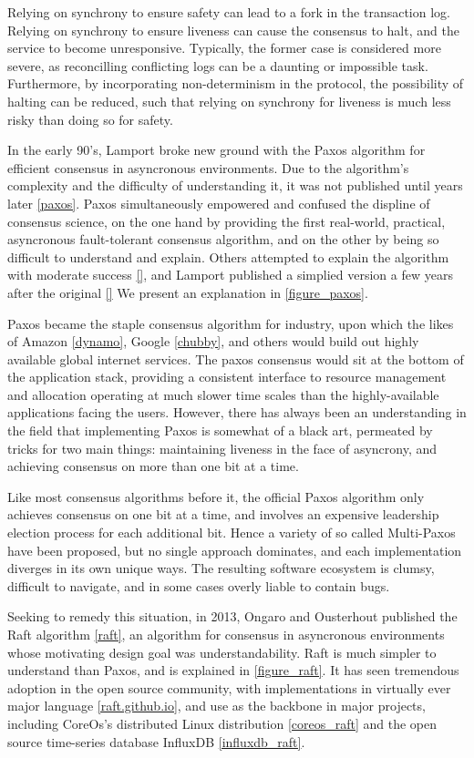 Relying on synchrony to ensure safety can lead to a fork in the transaction log.
Relying on synchrony to ensure liveness can cause the consensus to halt, and the service to become unresponsive.
Typically, the former case is considered more severe, as reconcilling conflicting logs can be a daunting or impossible task. 
Furthermore, by incorporating non-determinism in the protocol, the possibility of halting can be reduced,
such that relying on synchrony for liveness is much less risky than doing so for safety. 

In the early 90's, Lamport broke new ground with the Paxos algorithm for efficient consensus in asyncronous environments.
Due to the algorithm's complexity and the difficulty of understanding it, it was not published until years later \ref{paxos}.
Paxos simultaneously empowered and confused the displine of consensus science,
on the one hand by providing the first real-world, practical, asyncronous fault-tolerant consensus algorithm,
and on the other by being so difficult to understand and explain.
Others attempted to explain the algorithm with moderate success \ref{}, and Lamport published a simplied version 
a few years after the original \ref{}
We present an explanation in \ref{figure_paxos}.

Paxos became the staple consensus algorithm for industry, upon which the likes of Amazon \ref{dynamo}, Google \ref{chubby}, and others would build out highly available global internet services.
The paxos consensus would sit at the bottom of the application stack, providing a consistent interface to resource management and allocation operating at much slower time scales than the highly-available applications facing the users.
However, there has always been an understanding in the field that implementing Paxos is somewhat of a black art,
permeated by tricks for two main things: maintaining liveness in the face of asyncrony, and achieving consensus on more than one bit at a time.

Like most consensus algorithms before it, the official Paxos algorithm only achieves consensus on one bit at a time,
and involves an expensive leadership election process for each additional bit. 
Hence a variety of so called Multi-Paxos have been proposed, but no single approach dominates, 
and each implementation diverges in its own unique ways. 
The resulting software ecosystem is clumsy, difficult to navigate, and in some cases overly liable to contain bugs.

Seeking to remedy this situation, in 2013, Ongaro and Ousterhout published the Raft algorithm \ref{raft},
an algorithm for consensus in asyncronous environments whose motivating design goal was understandability.
Raft is much simpler to understand than Paxos, and is explained in \ref{figure_raft}. 
It has seen tremendous adoption in the open source community, with implementations in virtually ever major language \ref{raft.github.io},
and use as the backbone in major projects, including CoreOs's distributed Linux distribution \ref{coreos_raft} and the open source time-series database InfluxDB \ref{influxdb_raft}.

